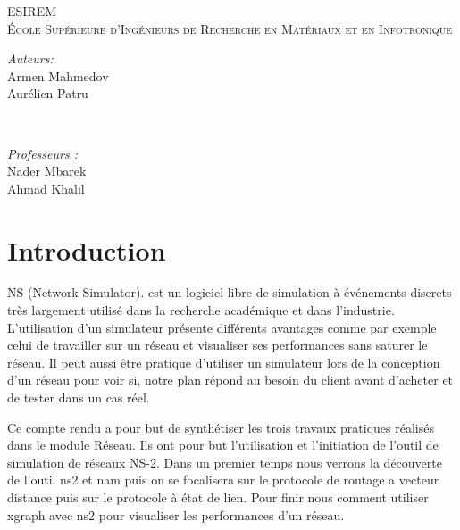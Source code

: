 \documentclass[11pt]{article}
\begin{document}
\begin{titlepage}
	\begin{center}
        \textsc{\large
        	ESIREM \\
			École Supérieure d'Ingénieurs de Recherche en Matériaux et en Infotronique\\       	
			[1.6cm]
		}
	\end{center}

	\begin{minipage}{0.5\textwidth}
		\begin{flushleft} \large
			\emph{Auteurs:}\\
			Armen Mahmedov \\
			Aurélien Patru
		\end{flushleft}
	\end{minipage}
	~
	\begin{minipage}{0.5\textwidth}
		\begin{flushright}\large
			\emph{Professeurs :} \\
			Nader Mbarek \\
			Ahmad Khalil
		\end{flushright}
	\end{minipage}
        
\end{titlepage}
  
\newpage
\strut
\newpage

\tableofcontents

\pagebreak

\listoffigures

\pagebreak


\section*{Introduction}
NS (Network Simulator). est un logiciel libre de simulation à événements discrets très largement utilisé dans la recherche académique et dans l'industrie. L'utilisation d'un simulateur présente différents avantages comme par exemple celui de travailler sur un réseau et visualiser ses performances sans saturer le réseau. Il peut aussi être pratique d'utiliser un simulateur lors de la conception d'un réseau pour voir si, notre plan répond au besoin du client avant d'acheter et de tester dans un cas réel.

Ce compte rendu a pour but de synthétiser les trois travaux pratiques réalisés dans le module Réseau. Ils ont pour but l’utilisation et l’initiation de l’outil de simulation de réseaux NS-2. Dans un premier temps nous verrons la découverte de l'outil ns2 et nam puis on se focalisera sur le protocole de routage a vecteur distance puis sur le protocole à état de lien. Pour finir nous comment utiliser xgraph avec ns2 pour visualiser les performances d'un réseau.
\end{document}
